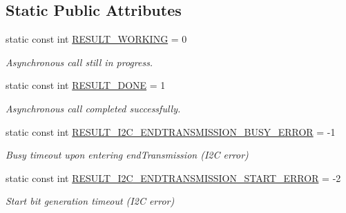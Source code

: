 \subsection*{Static Public Attributes}
\begin{DoxyCompactItemize}
\item 
\mbox{\label{class_d_s2482_command_a269ffc6a2090135a5e5909525598a21d}} 
static const int \mbox{\hyperlink{class_d_s2482_command_a269ffc6a2090135a5e5909525598a21d}{R\+E\+S\+U\+L\+T\+\_\+\+W\+O\+R\+K\+I\+NG}} = 0
\begin{DoxyCompactList}\small\item\em Asynchronous call still in progress. \end{DoxyCompactList}\item 
\mbox{\label{class_d_s2482_command_a8ffcf84807c97928dbfc61d75788e32b}} 
static const int \mbox{\hyperlink{class_d_s2482_command_a8ffcf84807c97928dbfc61d75788e32b}{R\+E\+S\+U\+L\+T\+\_\+\+D\+O\+NE}} = 1
\begin{DoxyCompactList}\small\item\em Asynchronous call completed successfully. \end{DoxyCompactList}\item 
\mbox{\label{class_d_s2482_command_a07c18f39af72106ebf86b0cdfb315a83}} 
static const int \mbox{\hyperlink{class_d_s2482_command_a07c18f39af72106ebf86b0cdfb315a83}{R\+E\+S\+U\+L\+T\+\_\+\+I2\+C\+\_\+\+E\+N\+D\+T\+R\+A\+N\+S\+M\+I\+S\+S\+I\+O\+N\+\_\+\+B\+U\+S\+Y\+\_\+\+E\+R\+R\+OR}} = -\/1
\begin{DoxyCompactList}\small\item\em Busy timeout upon entering end\+Transmission (I2C error) \end{DoxyCompactList}\item 
\mbox{\label{class_d_s2482_command_a5a96cae08078b71152cba451e580e812}} 
static const int \mbox{\hyperlink{class_d_s2482_command_a5a96cae08078b71152cba451e580e812}{R\+E\+S\+U\+L\+T\+\_\+\+I2\+C\+\_\+\+E\+N\+D\+T\+R\+A\+N\+S\+M\+I\+S\+S\+I\+O\+N\+\_\+\+S\+T\+A\+R\+T\+\_\+\+E\+R\+R\+OR}} = -\/2
\begin{DoxyCompactList}\small\item\em Start bit generation timeout (I2C error) \end{DoxyCompactList}\item 

\end{DoxyCompactItemize}
